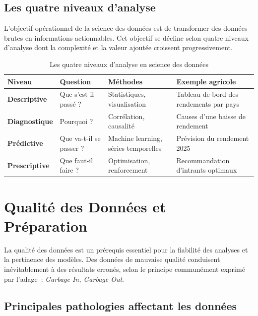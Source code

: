 \subsection{Les quatre niveaux d'analyse}

L'objectif opérationnel de la science des données est de transformer des données brutes en informations actionnables. Cet objectif se décline selon quatre niveaux d'analyse dont la complexité et la valeur ajoutée croissent progressivement.

\begin{table}[H]
\centering
\caption{Les quatre niveaux d'analyse en science des données}
\label{tab:niveaux-analyse}
\renewcommand{\arraystretch}{1.4}
\begin{tabularx}{\textwidth}{|>{\bfseries}p{3cm}|p{3cm}|p{3.5cm}|p{3.8cm}|}
\hline
\rowcolor{maingreen!15}\textbf{Niveau} & \textbf{Question} & \textbf{Méthodes} & \textbf{Exemple agricole} \\
\hline
Descriptive & Que s'est-il passé ? & Statistiques, visualisation & Tableau de bord des rendements par pays \\
\hline
Diagnostique & Pourquoi ? & Corrélation, causalité & Causes d'une baisse de rendement \\
\hline
Prédictive & Que va-t-il se passer ? & Machine learning, séries temporelles & Prévision du rendement 2025 \\
\hline
Prescriptive & Que faut-il faire ? & Optimisation, renforcement & Recommandation d'intrants optimaux \\
\hline
\end{tabularx}
\end{table}

\section{Qualité des Données et Préparation}

La qualité des données est un prérequis essentiel pour la fiabilité des analyses et la pertinence des modèles. Des données de mauvaise qualité conduisent inévitablement à des résultats erronés, selon le principe communément exprimé par l'adage~: \textit{Garbage In, Garbage Out}.

\subsection{Principales pathologies affectant les données}

